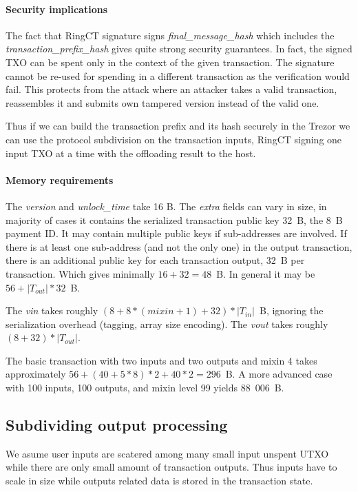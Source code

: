 \documentclass[]{article}
\begin{document}
\paragraph{Security implications}
The fact that RingCT signature signs \emph{final\_message\_hash} which includes the \emph{transaction\_prefix\_hash} gives quite strong security guarantees. In fact, the signed TXO can be spent only in the context of the given transaction. The signature cannot be re-used for spending in a different transaction as the verification would fail. This protects from the attack where an attacker takes a valid transaction, reassembles it and submits own tampered version instead of the valid one.

Thus if we can build the transaction prefix and its hash securely in the Trezor we can use the protocol subdivision on the transaction inputs, RingCT signing one input TXO at a time with the offloading result to the host. 

\paragraph{Memory requirements}
The \emph{version} and \emph{unlock\_time} take 16 B. The \emph{extra} fields can vary in size, in majority of cases it contains the serialized transaction public key 32~B, the 8~B payment ID. It may contain multiple public keys if sub-addresses are involved. If there is at least one sub-address (and not the only one) in the output transaction, there is an additional public key for each transaction output, 32~B per transaction. Which gives minimally $16 + 32 = 48$~B. In general it may be $56 + \left|T_{out}\right| * 32$~B.

The \emph{vin} takes roughly $(8 + 8 * (mixin + 1) + 32) * \left|T_{in}\right|$~B, ignoring the serialization overhead (tagging, array size encoding). The \emph{vout} takes roughly $(8 + 32) * \left|T_{out}\right|$.

The basic transaction with two inputs and two outputs and mixin 4 takes approximately $56 + (40 + 5*8)*2 + 40*2 = 296$~B. A more advanced case with 100 inputs, 100 outputs, and mixin level 99 yields 88~006~B.  

\subsection{Subdividing output processing}
We asume user inputs are scatered among many small input unspent UTXO while there are only small amount of transaction outputs. Thus inputs have to scale in size while outputs related data is stored in the transaction state.
\end{document}
